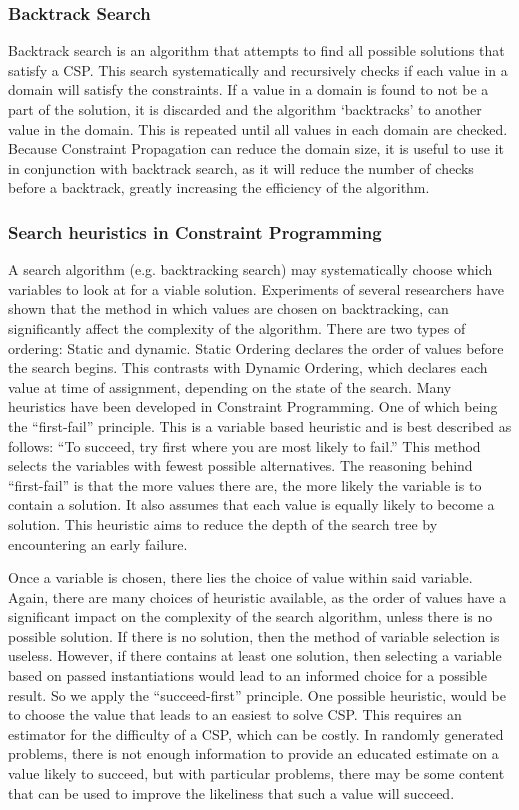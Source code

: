 \documentclass{article}
\begin{document}
	\subsubsection{Backtrack Search}
	Backtrack search is an algorithm that attempts to find all possible solutions that satisfy a CSP. This search systematically and recursively checks if each value in a domain will satisfy the constraints. If a value in a domain is found to not be a part of the solution, it is discarded and the algorithm ‘backtracks’ to another value in the domain. This is repeated until all values in each domain are checked. Because Constraint Propagation can reduce the domain size, it is useful to use it in conjunction with backtrack search, as it will reduce the number of checks before a backtrack, greatly increasing the efficiency of the algorithm.
	
	\subsubsection{Search heuristics in Constraint Programming}
	A search algorithm (e.g. backtracking search) may systematically choose which variables to look at for a viable solution. Experiments of several researchers\cite{cp} have shown that the method in which values are chosen on backtracking, can significantly affect the complexity of the algorithm. There are two types of ordering: Static and dynamic. Static Ordering declares the order of values before the search begins. This contrasts with Dynamic Ordering, which declares each value at time of assignment, depending on the state of the search. Many heuristics have been developed in Constraint Programming. One of which being the “first-fail” principle. This is a variable based heuristic and is best described as follows: 
	“To succeed, try first where you are most likely to fail.”
	This method selects the variables with fewest possible alternatives. The reasoning behind “first-fail” is that the more values there are, the more likely the variable is to contain a solution. It also assumes that each value is equally likely to become a solution. This heuristic aims to reduce the depth of the search tree by encountering an early failure.
	
	
	Once a variable is chosen, there lies the choice of value within said variable. Again, there are many choices of heuristic available, as the order of values have a significant impact on the complexity of the search algorithm, unless there is no possible solution. If there is no solution, then the method of variable selection is useless. However, if there contains at least one solution, then selecting a variable based on passed instantiations would lead to an informed choice for a possible result. So we apply the “succeed-first” principle. One possible heuristic, would be to choose the value that leads to an easiest to solve CSP. This requires an estimator for the difficulty of a CSP, which can be costly. In randomly generated problems, there is not enough information to provide an educated estimate on a value likely to succeed, but with particular problems, there may be some content that can be used to improve the likeliness that such a value will succeed.
	
\end{document}
